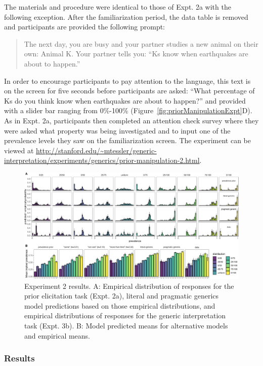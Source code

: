 \documentclass[floatsintext,doc]{apa6}
\begin{document}
The materials and procedure were identical to those of Expt. 2a with the following exception.
After the familiarization period, the data table is removed and participants are provided the following prompt:

\begin{quote}
The next day, you are busy and your partner studies a new animal on their own: Animal K.
Your partner tells you: \enquote{Ks know when earthquakes are about to happen.}
\end{quote}

In order to encourage participants to pay attention to the language, this text is on the screen for five seconds before participants are asked: \enquote{What percentage of Ks do you think know when earthquakes are about to happen?} and provided with a slider bar ranging from 0\%-100\% (Figure~\ref{fig:priorManipulationExpt}D).
As in Expt. 2a, participants then completed an attention check survey where they were asked what property was being investigated and to input one of the prevalence levels they saw on the familiarization screen.
The experiment can be viewed at \url{http://stanford.edu/~mtessler/generic-interpretation/experiments/generics/prior-manipulation-2.html}.

\begin{figure}
\centering
\includegraphics{genint_files/figure-latex/priorManipulationResults-1.pdf}
\caption{\label{fig:priorManipulationResults}Experiment 2 results. A: Empirical distribution of responses for the prior elicitation task (Expt. 2a), literal and pragmatic generics model predictions based on those empirical distributions, and empirical distributions of responses for the generic interpretation task (Expt. 3b). B: Model predicted means for alternative models and empirical means.}
\end{figure}

\hypertarget{results-2}{%
\subsubsection{Results}\label{results-2}}
\end{document}
